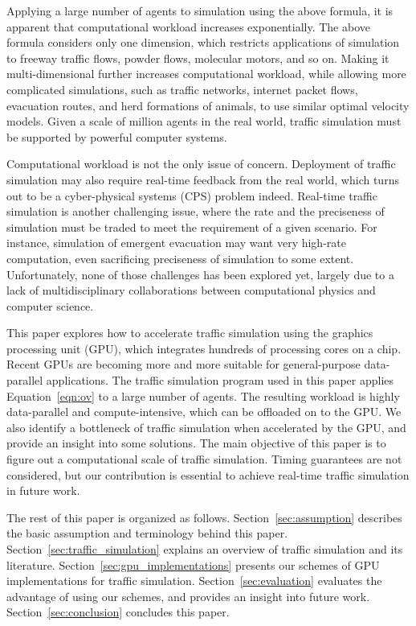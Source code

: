 \documentclass[times, 10pt, twocolumn]{article}
\begin{document}
Applying a large number of agents to simulation using the above formula,
it is apparent that computational workload increases exponentially.
The above formula considers only one dimension, which restricts
applications of simulation to freeway traffic flows, powder flows,
molecular motors, and so on.
Making it multi-dimensional further increases computational workload,
while allowing more complicated simulations, such as traffic networks,
internet packet flows, evacuation routes, and herd formations of
animals, to use similar optimal velocity models.
Given a scale of million agents in the real world, traffic simulation
must be supported by powerful computer systems.

Computational workload is not the only issue of concern.
Deployment of traffic simulation may also require real-time feedback
from the real world, which turns out to be a cyber-physical systems
(CPS) problem indeed.
Real-time traffic simulation is another challenging issue, where
the rate and the preciseness of simulation must be traded to meet the
requirement of a given scenario.
For instance, simulation of emergent evacuation may want very high-rate
computation, even sacrificing preciseness of simulation to some extent.
Unfortunately, none of those challenges has been explored yet, largely
due to a lack of multidisciplinary collaborations between computational
physics and computer science.

This paper explores how to accelerate traffic simulation using the
graphics processing unit (GPU), which integrates hundreds of processing
cores on a chip.
Recent GPUs are becoming more and more suitable for general-purpose
data-parallel applications.
The traffic simulation program used in this paper applies
Equation~\eqref{eqn:ov} to a large number of agents.
The resulting workload is highly data-parallel and compute-intensive,
which can be offloaded on to the GPU.
We also identify a bottleneck of traffic simulation when accelerated by
the GPU, and provide an insight into some solutions.
The main objective of this paper is to figure out a computational scale
of traffic simulation.
Timing guarantees are not considered, but our contribution is essential
to achieve real-time traffic simulation in future work.

The rest of this paper is organized as follows.
Section~\ref{sec:assumption} describes the basic assumption and
terminology behind this paper.
Section~\ref{sec:traffic_simulation} explains an overview of
traffic simulation and its literature.
Section~\ref{sec:gpu_implementations} presents our schemes of GPU
implementations for traffic simulation.
Section~\ref{sec:evaluation} evaluates the advantage of using our
schemes, and provides an insight into future work.
Section~\ref{sec:conclusion} concludes this paper.
\end{document}
